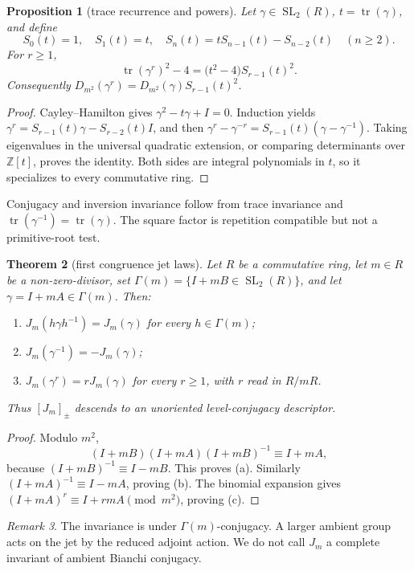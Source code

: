 \documentclass[11pt,a4paper]{article}
\newtheorem{theorem}{Theorem}[section]
\newtheorem{proposition}[theorem]{Proposition}
\theoremstyle{definition}
\theoremstyle{remark}
\newtheorem{remark}[theorem]{Remark}
\newcommand{\SL}{\operatorname{SL}}
\newcommand{\tr}{\operatorname{tr}}
\begin{document}
\begin{proposition}[trace recurrence and powers]\label{prop:powerdisc}
Let \(\gamma\in\SL_2(R)\), \(t=\tr(\gamma)\), and define
\[
 S_0(t)=1,\quad S_1(t)=t,\quad
 S_n(t)=tS_{n-1}(t)-S_{n-2}(t)\quad(n\ge2).
\]
For \(r\ge1\),
\[
 \tr(\gamma^r)^2-4=\bigl(t^2-4\bigr)S_{r-1}(t)^2.
\]
Consequently \(D_{m^2}(\gamma^r)=D_{m^2}(\gamma)S_{r-1}(t)^2\).
\end{proposition}

\begin{proof}
Cayley--Hamilton gives \(\gamma^2-t\gamma+I=0\). Induction yields \(\gamma^r=S_{r-1}(t)\gamma-S_{r-2}(t)I\), and then
\(\gamma^r-\gamma^{-r}=S_{r-1}(t)(\gamma-\gamma^{-1})\).
Taking eigenvalues in the universal quadratic extension, or comparing determinants over \(\mathbb Z[t]\), proves the identity. Both sides are integral polynomials in \(t\), so it specializes to every commutative ring.
\end{proof}

Conjugacy and inversion invariance follow from trace invariance and \(\tr(\gamma^{-1})=\tr(\gamma)\). The square factor is repetition compatible but not a primitive-root test.

\begin{theorem}[first congruence jet laws]\label{thm:jet}
Let \(R\) be a commutative ring, let \(m\in R\) be a non-zero-divisor,
set \(\Gamma(m)=\{I+mB\in\SL_2(R)\}\), and let
\(\gamma=I+mA\in\Gamma(m)\). Then:
\begin{enumerate}[label=(\alph*)]
 \item \(J_m(h\gamma h^{-1})=J_m(\gamma)\) for every \(h\in\Gamma(m)\);
 \item \(J_m(\gamma^{-1})=-J_m(\gamma)\);
 \item \(J_m(\gamma^r)=rJ_m(\gamma)\) for every \(r\ge1\), with \(r\) read in \(R/mR\).
\end{enumerate}
Thus \([J_m]_{\pm}\) descends to an unoriented level-conjugacy descriptor.
\end{theorem}

\begin{proof}
Modulo \(m^2\),
\[
 (I+mB)(I+mA)(I+mB)^{-1}\equiv I+mA,
\]
because \((I+mB)^{-1}\equiv I-mB\). This proves (a). Similarly \((I+mA)^{-1}\equiv I-mA\), proving (b). The binomial expansion gives \((I+mA)^r\equiv I+rmA\pmod{m^2}\), proving (c).
\end{proof}

\begin{remark}
The invariance is under \(\Gamma(m)\)-conjugacy. A larger ambient group acts on the jet by the reduced adjoint action. We do not call \(J_m\) a complete invariant of ambient Bianchi conjugacy.
\end{remark}
\end{document}
